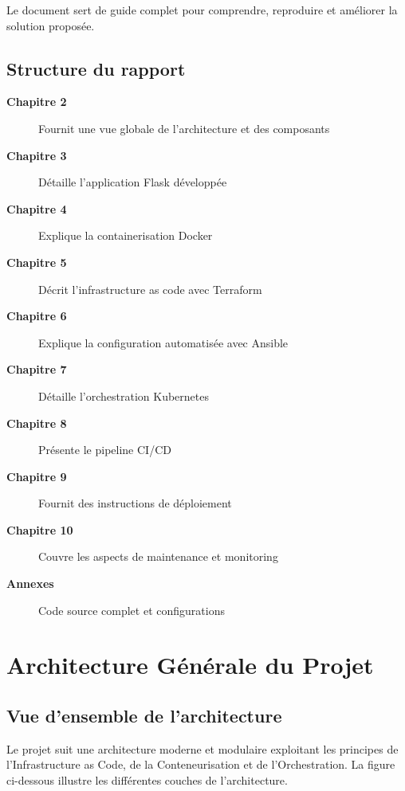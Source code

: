 \documentclass[12pt,a4paper,twoside]{report}
\begin{document}
Le document sert de guide complet pour comprendre, reproduire et améliorer la solution proposée.

\section{Structure du rapport}

\begin{description}
    \item[\textbf{Chapitre 2}] Fournit une vue globale de l'architecture et des composants
    \item[\textbf{Chapitre 3}] Détaille l'application Flask développée
    \item[\textbf{Chapitre 4}] Explique la containerisation Docker
    \item[\textbf{Chapitre 5}] Décrit l'infrastructure as code avec Terraform
    \item[\textbf{Chapitre 6}] Explique la configuration automatisée avec Ansible
    \item[\textbf{Chapitre 7}] Détaille l'orchestration Kubernetes
    \item[\textbf{Chapitre 8}] Présente le pipeline CI/CD
    \item[\textbf{Chapitre 9}] Fournit des instructions de déploiement
    \item[\textbf{Chapitre 10}] Couvre les aspects de maintenance et monitoring
    \item[\textbf{Annexes}] Code source complet et configurations
\end{description}

\newpage

\chapter{Architecture Générale du Projet}

\section{Vue d'ensemble de l'architecture}

Le projet suit une architecture moderne et modulaire exploitant les principes de l'Infrastructure as Code, de la Conteneurisation et de l'Orchestration. La figure ci-dessous illustre les différentes couches de l'architecture.
\end{document}
